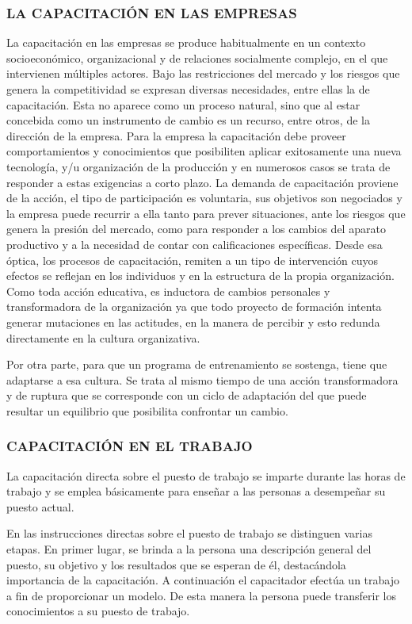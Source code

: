 \subsubsection*{LA CAPACITACIÓN EN LAS EMPRESAS}
La capacitación en las empresas se produce habitualmente en un contexto socioeconómico, organizacional y de relaciones socialmente complejo, en el que intervienen múltiples actores. Bajo las restricciones del mercado y los riesgos que genera la competitividad se expresan diversas necesidades, entre ellas la de capacitación. Esta no aparece como un proceso natural, sino que al estar concebida como un instrumento de cambio es un recurso, entre otros, de la dirección de la empresa. Para la empresa la capacitación debe proveer comportamientos y conocimientos que posibiliten aplicar exitosamente una nueva tecnología, y/u organización de la producción y en numerosos casos se trata de responder a estas exigencias a corto plazo. La demanda de capacitación proviene de la acción, el tipo de participación es voluntaria, sus objetivos son negociados y la empresa puede recurrir a ella tanto para prever situaciones, ante los riesgos que genera la presión del mercado, como para responder a los cambios del aparato productivo y a la necesidad de contar con calificaciones específicas. Desde esa óptica, los procesos de capacitación, remiten a un tipo de intervención cuyos efectos se reflejan en los individuos y en la estructura de la propia organización. Como toda acción educativa, es inductora de cambios personales y transformadora de la organización ya que todo proyecto de formación intenta generar mutaciones en las actitudes, en la manera de percibir y esto redunda directamente en la cultura organizativa.

Por otra parte, para que un programa de entrenamiento se sostenga, tiene que adaptarse a esa cultura. Se trata al mismo tiempo de una acción transformadora y de ruptura que se corresponde con un ciclo de adaptación del que puede resultar un equilibrio que posibilita confrontar un cambio.

\subsubsection*{CAPACITACIÓN EN EL TRABAJO}
La capacitación directa sobre el puesto de trabajo se imparte durante las horas de trabajo y se emplea básicamente para enseñar a las personas a desempeñar su puesto actual.

En las instrucciones directas sobre el puesto de trabajo se distinguen varias etapas. En primer lugar, se brinda a la persona una descripción general del puesto, su objetivo y los resultados que se esperan de él, destacándola importancia de la capacitación. A continuación el capacitador efectúa un trabajo a fin de proporcionar un modelo. De esta manera la persona puede transferir los conocimientos a su puesto de trabajo.

